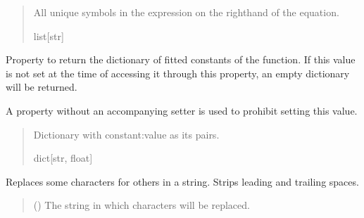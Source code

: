 \documentclass[letterpaper,10pt,english]{sphinxmanual}
\begin{document}
\begin{fulllineitems}
\begin{fulllineitems}
\begin{quote}
\begin{description}
\sphinxAtStartPar
All unique symbols in the expression on the right\sphinxhyphen{}hand of the equation.

\sphinxAtStartPar
list{[}str{]}

\end{description}\end{quote}

\end{fulllineitems}


\begin{fulllineitems}
\label{\detokenize{VPCModel:src.VPCModel.VPCModel.fitted_consts}}
\pysigstartsignatures
{}
\pysigstopsignatures
\sphinxAtStartPar
Property to return the dictionary of fitted constants of the function.
If this value is not set at the time of accessing it through this property,
an empty dictionary will be returned.

\sphinxAtStartPar
A property without an accompanying setter is used to prohibit setting this value.
\begin{quote}\begin{description}
\sphinxAtStartPar
Dictionary with constant:value as its pairs.

\sphinxAtStartPar
dict{[}str, float{]}

\end{description}\end{quote}

\end{fulllineitems}


\begin{fulllineitems}
\label{\detokenize{VPCModel:src.VPCModel.VPCModel.format_eq}}
\pysigstartsignatures
{}
\pysigstopsignatures
\sphinxAtStartPar
Replaces some characters for others in a string. Strips leading and trailing spaces.
\begin{quote}\begin{description}
\sphinxAtStartPar
{} () \textendash{} The string in which characters will be replaced.


\end{description}
\end{quote}
\end{fulllineitems}
\end{fulllineitems}
\end{document}
